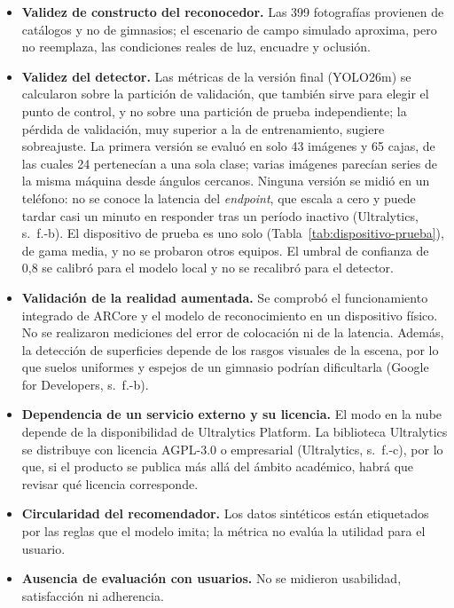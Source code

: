 \begin{itemize}
    \item \textbf{Validez de constructo del reconocedor.} Las 399 fotografías
    provienen de catálogos y no de gimnasios; el escenario de campo simulado
    aproxima, pero no reemplaza, las condiciones reales de luz, encuadre y
    oclusión.
    \item \textbf{Validez del detector.} Las métricas de la versión final
    (YOLO26m) se calcularon sobre la partición de validación, que también sirve
    para elegir el punto de control, y no sobre una partición de prueba
    independiente; la pérdida de validación, muy superior a la de entrenamiento,
    sugiere sobreajuste. 
    La primera versión se evaluó en solo 43 imágenes y 65 cajas, de las cuales 24 pertenecían a una sola clase; varias
    imágenes parecían series de la misma máquina desde ángulos cercanos. Ninguna
    versión se midió en un teléfono: no se conoce la latencia del \emph{endpoint},
    que escala a cero y puede tardar casi un minuto en responder tras un período
    inactivo (Ultralytics, s.~f.-b). El dispositivo de prueba es uno solo
    (Tabla~\ref{tab:dispositivo-prueba}), de gama media, y no se probaron otros
    equipos. El umbral de confianza de 0,8 se calibró
    para el modelo local y no se recalibró para el detector.
    \item \textbf{Validación de la realidad aumentada.} Se comprobó el funcionamiento
    integrado de ARCore y el modelo de reconocimiento en un dispositivo físico.
    No se realizaron mediciones del error de colocación ni de la latencia. Además, la detección de superficies depende de los rasgos visuales
    de la escena, por lo que suelos uniformes y espejos de un gimnasio podrían
    dificultarla (Google for Developers, s.~f.-b).
    \item \textbf{Dependencia de un servicio externo y su licencia.} El modo en
    la nube depende de la disponibilidad de Ultralytics Platform. La biblioteca
    Ultralytics se distribuye con licencia AGPL-3.0 o empresarial (Ultralytics,
    s.~f.-c), por lo que, si el producto se publica más allá del ámbito
    académico, habrá que revisar qué licencia corresponde.
    \item \textbf{Circularidad del recomendador.} Los datos sintéticos están
    etiquetados por las reglas que el modelo imita; la métrica no evalúa la
    utilidad para el usuario.
    \item \textbf{Ausencia de evaluación con usuarios.} No se midieron
    usabilidad, satisfacción ni adherencia. 

\end{itemize}
